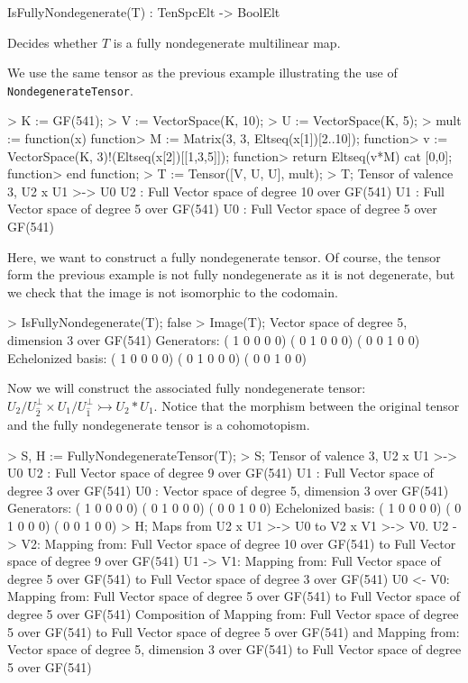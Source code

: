 \begin{intrinsics}
IsFullyNondegenerate(T) : TenSpcElt -> BoolElt
\end{intrinsics}

Decides whether $T$ is a fully nondegenerate multilinear map.

\begin{example}[FullyNondegenerate]

We use the same tensor as the previous example illustrating the use of {\tt NondegenerateTensor}.
\begin{code}
> K := GF(541);
> V := VectorSpace(K, 10);
> U := VectorSpace(K, 5);
> mult := function(x)
function>   M := Matrix(3, 3, Eltseq(x[1])[2..10]);
function>   v := VectorSpace(K, 3)!(Eltseq(x[2])[[1,3,5]]);
function>   return Eltseq(v*M) cat [0,0];
function> end function;
> T := Tensor([V, U, U], mult);
> T;
Tensor of valence 3, U2 x U1 >-> U0
U2 : Full Vector space of degree 10 over GF(541)
U1 : Full Vector space of degree 5 over GF(541)
U0 : Full Vector space of degree 5 over GF(541)
\end{code}

Here, we want to construct a fully nondegenerate tensor. 
Of course, the tensor form the previous example is not fully nondegenerate as it is not degenerate, but we check that the image is not isomorphic to the codomain.
\begin{code}
> IsFullyNondegenerate(T);
false
> Image(T);
Vector space of degree 5, dimension 3 over GF(541)
Generators:
(  1   0   0   0   0)
(  0   1   0   0   0)
(  0   0   1   0   0)
Echelonized basis:
(  1   0   0   0   0)
(  0   1   0   0   0)
(  0   0   1   0   0)
\end{code}

Now we will construct the associated fully nondegenerate tensor: $U_2/U_{\widehat{2}}^\perp\times U_1/U_{\widehat{1}}^\perp\rightarrowtail U_2*U_1$.
Notice that the morphism between the original tensor and the fully nondegenerate tensor is a cohomotopism.
\begin{code}
> S, H := FullyNondegenerateTensor(T);
> S;
Tensor of valence 3, U2 x U1 >-> U0
U2 : Full Vector space of degree 9 over GF(541)
U1 : Full Vector space of degree 3 over GF(541)
U0 : Vector space of degree 5, dimension 3 over GF(541)
Generators:
(  1   0   0   0   0)
(  0   1   0   0   0)
(  0   0   1   0   0)
Echelonized basis:
(  1   0   0   0   0)
(  0   1   0   0   0)
(  0   0   1   0   0)
> H;
Maps from U2 x U1 >-> U0 to V2 x V1 >-> V0.
U2 -> V2: Mapping from: Full Vector space of degree 10 over GF(541) to
Full Vector space of degree 9 over GF(541)
U1 -> V1: Mapping from: Full Vector space of degree 5 over GF(541) to
Full Vector space of degree 3 over GF(541)
U0 <- V0: Mapping from: Full Vector space of degree 5 over GF(541) to
Full Vector space of degree 5 over GF(541)
Composition of Mapping from: Full Vector space of degree 5 over GF(541)
to Full Vector space of degree 5 over GF(541) and
Mapping from: Vector space of degree 5, dimension 3 over GF(541) to Full
Vector space of degree 5 over GF(541)
\end{code}
\end{example}

